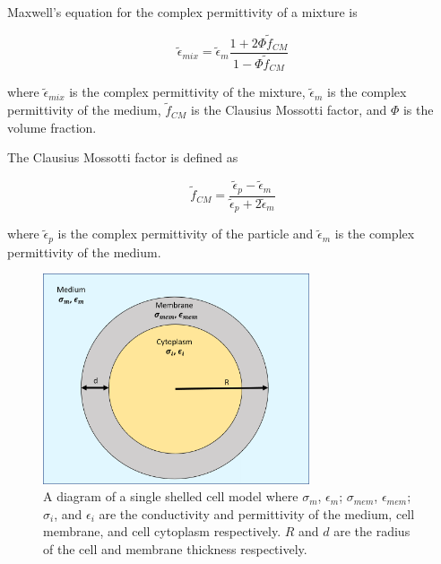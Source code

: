  Maxwell's equation for the complex permittivity of a mixture is
  
  \begin{equation}
      \tilde{\epsilon}_{mix} = \tilde{\epsilon}_m\frac{1 + 2\Phi\tilde{f}_{CM}}{1-\Phi\tilde{f}_{CM}}
  \end{equation}
  
  \noindent where $\tilde{\epsilon}_{mix}$ is the complex permittivity of the mixture, $\tilde{\epsilon}_m$ is the complex permittivity of the medium, $\tilde{f}_{CM}$ is the Clausius Mossotti factor, and $\Phi$ is the volume fraction.
  
  \par The Clausius Mossotti factor is defined as 
  
  \begin{equation}
    \tilde{f}_{CM} = \frac{\tilde{\epsilon}_p - \tilde{\epsilon}_m}{\tilde{\epsilon}_p + 2\tilde{\epsilon}_m} 
  \end{equation}
  
  \noindent
  
  where $\tilde{\epsilon}_p$ is the complex permittivity of the particle and $\tilde{\epsilon}_m$ is the complex permittivity of the medium. 

 \begin{figure}[ht]
 \centering
 \includegraphics[width=0.7\textwidth]{images/singleShelledCell.png}
 \caption[Diagram of single shelled cell model.]{A diagram of a single shelled cell model where $\sigma_m$, $\epsilon_m$; $\sigma_{mem}$, $\epsilon_{mem}$; $\sigma_i$, and $\epsilon_i$ are the conductivity and permittivity of the medium, cell membrane, and cell cytoplasm respectively. $R$ and $d$ are the radius of the cell and membrane thickness respectively.}
 \label{apx:apx:fig:single_shell_apx}
 \end{figure}

